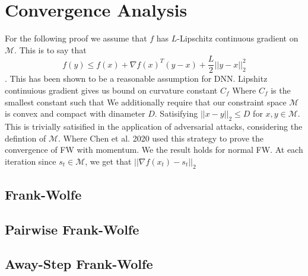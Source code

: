\documentclass{article}
\begin{document}
\section{Convergence Analysis}
For the following proof we assume that $f$ has $L$-Lipschitz continuous gradient on $\mathcal{M}$. This is to say that 
$$ f(y) \leq f(x) + \nabla f(x)^T (y-x) + \frac{L}{2}||y-x||_2^2$$.
This has been shown to be a reasonable assumption for DNN. %
Lipshitz continuious gradient gives us bound on curvature constant $C_f$ %
Where $C_f$ is the smallest constant such that 
We additionally require that our constraint space $\mathcal{M}$ is convex and compact with dinameter $D$. Satisifying $||x-y||_2 \leq D$ for $x,y \in \mathcal{M}$. This is trivially satisified in the application of adversarial attacks, considering the defintion of $\mathcal{M}$. 
Where Chen et al. 2020 used this strategy to prove the convergence of FW with momentum. We the result holds for normal FW. 
At each iteration since $s_t \in \mathcal{M}$, we get that $||\nabla f(x_t) - s_t||_2$

\subsection{Frank-Wolfe}
\subsection{Pairwise Frank-Wolfe}
\subsection{Away-Step Frank-Wolfe}
\end{document}
